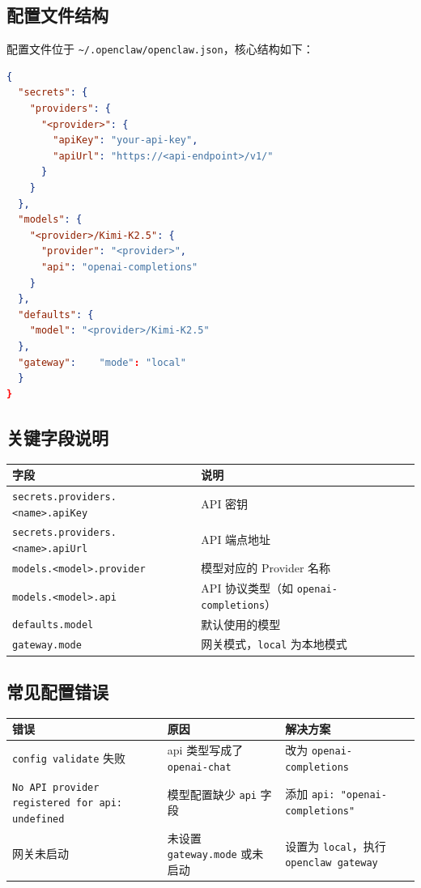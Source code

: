 \subsection{配置文件结构}


配置文件位于 \texttt{\textasciitilde{}/.openclaw/openclaw.json}，核心结构如下：

\begin{lstlisting}[language=json]
{
  "secrets": {
    "providers": {
      "<provider>": {
        "apiKey": "your-api-key",
        "apiUrl": "https://<api-endpoint>/v1/"
      }
    }
  },
  "models": {
    "<provider>/Kimi-K2.5": {
      "provider": "<provider>",
      "api": "openai-completions"
    }
  },
  "defaults": {
    "model": "<provider>/Kimi-K2.5"
  },
  "gateway":    "mode": "local"
  }
}
\end{lstlisting}

\subsection{关键字段说明}


\begin{table}[h]
\centering
\small
\begin{tabular}{|l|l|}
\hline
字段 & 说明 \\
\hline
\texttt{secrets.providers.<name>.apiKey} & API 密钥 \\
\hline
\texttt{secrets.providers.<name>.apiUrl} & API 端点地址 \\
\hline
\texttt{models.<model>.provider} & 模型对应的 Provider 名称 \\
\hline
\texttt{models.<model>.api} & API 协议类型（如 \texttt{openai-completions}） \\
\hline
\texttt{defaults.model} & 默认使用的模型 \\
\hline
\texttt{gateway.mode} & 网关模式，\texttt{local} 为本地模式 \\
\hline
\end{tabular}
\end{table}

\subsection{常见配置错误}


\begin{table}[h]
\centering
\small
\begin{tabular}{|l|l|l|}
\hline
错误 & 原因 & 解决方案 \\
\hline
\texttt{config validate} 失败 & api 类型写成了 \texttt{openai-chat} & 改为 \texttt{openai-completions} \\
\hline
\texttt{No API provider registered for api: undefined} & 模型配置缺少 \texttt{api} 字段 & 添加 \texttt{api: "openai-completions"} \\
\hline
网关未启动 & 未设置 \texttt{gateway.mode} 或未启动 & 设置为 \texttt{local}，执行 \texttt{openclaw gateway} \\
\hline
\end{tabular}
\end{table}

